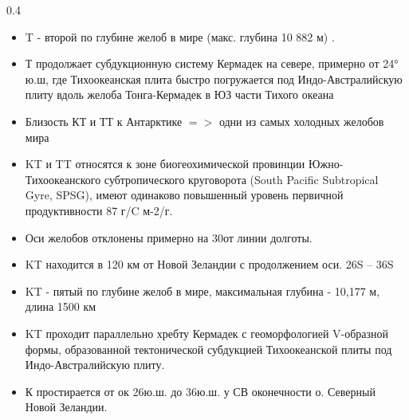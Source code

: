\documentclass[pdflatex,compress,8pt,
	xcolor={dvipsnames,dvipsnames,svgnames,x11names,table},
	hyperref={colorlinks = true,breaklinks = true, urlcolor = NavyBlue}]{beamer}
\begin{document}
\begin{frame}
\begin{minipage}[0.4\textheight]{\textwidth}
\begin{columns}[T]
\begin{column}{0.4\textwidth}
\begin{itemize}\scriptsize
            \item T - второй по глубине желоб в мире (макс. глубина 10 882 м) \cite{Blankenship}. 
            \item Т продолжает субдукционную систему Кермадек на севере, примерно от 24° ю.ш, где Тихоокеанская плита быстро погружается под Индо-Австралийскую плиту вдоль желоба Тонга-Кермадек в ЮЗ части Тихого океана
            \item Близость КТ и ТТ к Антарктике $=>$ одни из самых холодных желобов мира \cite{Belyaev}
            \item KT и TT относятся к зоне биогеохимической провинции Южно-Тихоокеанского субтропического круговорота (South Pacific Subtropical Gyre, SPSG), имеют одинаково повышенный уровень первичной продуктивности 87 г/C м-2/г. \cite{Xuetal2018}
            \item Оси желобов отклонены примерно на 30\degree от линии долготы.
            \item KT находится в 120 км от Новой Зеландии с продолжением оси. 26\degree S -- 36\degree S \cite{Duncan}
            \item KT - пятый по глубине желоб в мире, максимальная глубина - 10,177 м, длина 1500 км \cite{Jamiesonetal2011}
            \item KT проходит параллельно хребту Кермадек с геоморфологией V-образной формы, образованной тектонической субдукцией Тихоокеанской плиты под Индо-Австралийскую плиту. \cite{LeducRowden2018}
            \item К простирается от ок 26\degree ю.ш. до 36\degree ю.ш. у СВ оконечности о. Северный Новой Зеландии.
 \end{itemize}	
\end{column}

\end{columns}
\end{minipage}
\end{frame}
\end{document}
